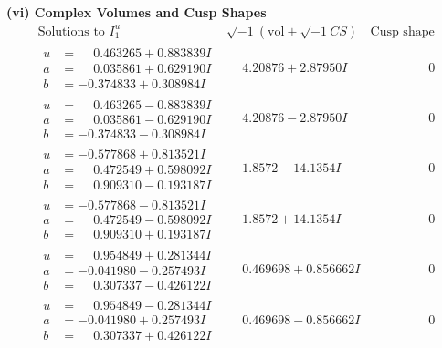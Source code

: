 \documentclass[1p]{elsarticle_modified}
\theoremstyle{definition}
\newcommand{\I}{\sqrt{-1}}
\begin{document}
\newpage\flushleft \textbf{(vi) Complex Volumes and Cusp Shapes}
$$\begin{array}{c|c|c}  
\text{Solutions to }I^u_{1}& \I (\text{vol} + \sqrt{-1}CS) & \text{Cusp shape}\\
 \hline 
\begin{aligned}
u &= \phantom{-}0.463265 + 0.883839 I \\
a &= \phantom{-}0.035861 + 0.629190 I \\
b &= -0.374833 + 0.308984 I\end{aligned}
 & \phantom{-}4.20876 + 2.87950 I & \phantom{-0.000000 } 0 \\ \hline\begin{aligned}
u &= \phantom{-}0.463265 - 0.883839 I \\
a &= \phantom{-}0.035861 - 0.629190 I \\
b &= -0.374833 - 0.308984 I\end{aligned}
 & \phantom{-}4.20876 - 2.87950 I & \phantom{-0.000000 } 0 \\ \hline\begin{aligned}
u &= -0.577868 + 0.813521 I \\
a &= \phantom{-}0.472549 + 0.598092 I \\
b &= \phantom{-}0.909310 - 0.193187 I\end{aligned}
 & \phantom{-}1.8572 - 14.1354 I & \phantom{-0.000000 } 0 \\ \hline\begin{aligned}
u &= -0.577868 - 0.813521 I \\
a &= \phantom{-}0.472549 - 0.598092 I \\
b &= \phantom{-}0.909310 + 0.193187 I\end{aligned}
 & \phantom{-}1.8572 + 14.1354 I & \phantom{-0.000000 } 0 \\ \hline\begin{aligned}
u &= \phantom{-}0.954849 + 0.281344 I \\
a &= -0.041980 - 0.257493 I \\
b &= \phantom{-}0.307337 - 0.426122 I\end{aligned}
 & \phantom{-}0.469698 + 0.856662 I & \phantom{-0.000000 } 0 \\ \hline\begin{aligned}
u &= \phantom{-}0.954849 - 0.281344 I \\
a &= -0.041980 + 0.257493 I \\
b &= \phantom{-}0.307337 + 0.426122 I\end{aligned}
 & \phantom{-}0.469698 - 0.856662 I & \phantom{-0.000000 } 0 \\ \hline\begin{aligned}

\end{aligned}
\end{array}$$
\end{document}
